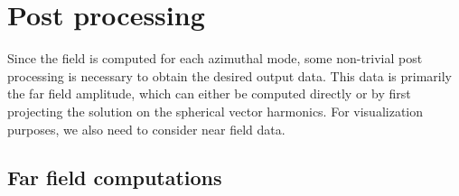 \documentclass[a4paper,12pt]{article}
\begin{document}
\section{Post processing}
\label{sec:postprocessing}

Since the field is computed for each azimuthal mode, some non-trivial
post processing is necessary to obtain the desired output data. This
data is primarily the far field amplitude, which can either be
computed directly or by first projecting the solution on the spherical
vector harmonics. For visualization purposes, we also need to consider
near field data.

\subsection{Far field computations}
\label{sec:farfield}
\end{document}
